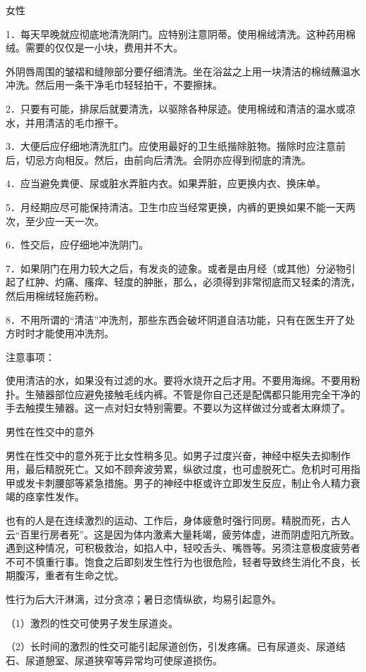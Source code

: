 \documentclass[12pt,UTF8]{ctexbook}
\begin{document}
女性

1．每天早晚就应彻底地清洗阴门。应特别注意阴蒂。使用棉绒清洗。这种药用棉绒。需要的仅仅是一小块，费用并不大。

外阴唇周围的皱褶和缝隙部分要仔细清洗。坐在浴盆之上用一块清洁的棉绒蘸温水冲洗。然后用一条干净毛巾轻轻拍干，不要擦抹。

2．只要有可能，排尿后就要清洗，以驱除各种尿迹。使用棉绒和清洁的温水或凉水，并用清洁的毛巾擦干。

3．大便后应仔细地清洗肛门。应使用最好的卫生纸揩除脏物。揩除时应注意前后，切忌方向相反。然后，由前向后清洗。会阴亦应得到彻底的清洗。

4．应当避免粪便、尿或脏水弄脏内衣。如果弄脏，应更换内衣、换床单。

5．月经期应尽可能保持清洁。卫生巾应当经常更换，内裤的更换如果不能一天两次，至少应一天一次。

6．性交后，应仔细地冲洗阴门。

7．如果阴门在用力较大之后，有发炎的迹象。或者是由月经（或其他）分泌物引起了红肿、灼痛、瘙痒、轻度的肿胀，那么，必须得到非常彻底而又轻柔的清洗，然后用棉绒轻施药粉。

8．不用所谓的“清洁”冲洗剂，那些东西会破坏阴道自洁功能，只有在医生开了处方时时才能使用冲洗剂。

注意事项：

使用清洁的水，如果没有过滤的水。要将水烧开之后才用。不要用海绵。不要用粉扑。生殖器部位应避免接触毛线内裤。不管是你自己还是配偶都只能用完全干净的手去触摸生殖器。这一点对妇女特别需要。不要以为这样做过分或者太麻烦了。





男性在性交中的意外


男性在性交中的意外死于比女性稍多见。如男子过度兴奋，神经中枢失去抑制作用，最后精脱死亡。又如不顾奔波劳累，纵欲过度，也可虚脱死亡。危机时可用指甲或发卡刺腰部等紧急措施。男子的神经中枢或许立即发生反应，制止令人精力衰竭的痉挛性发作。

也有的人是在连续激烈的运动、工作后，身体疲惫时强行同房。精脱而死，古人云“百里行房者死”。这是因为体内激素大量耗竭，疲劳体虚，进而阴虚阳亢所致。遇到这种情况，可积极救治，如掐人中，轻咬舌头、嘴唇等。另须注意极度疲劳者不可不慎重行事。饱食之后即刻发生性行为也很危险，轻者导致终生消化不良，长期腹泻，重者有生命之忧。

性行为后大汗淋漓，过分贪凉；暑日恣情纵欲，均易引起意外。

（1）激烈的性交可使男子发生尿道炎。

（2）长时间的激烈的性交可能引起尿道创伤，引发疼痛。已有尿道炎、尿道结石、尿道憩室、尿道狭窄等异常均可使尿道损伤。
\end{document}
